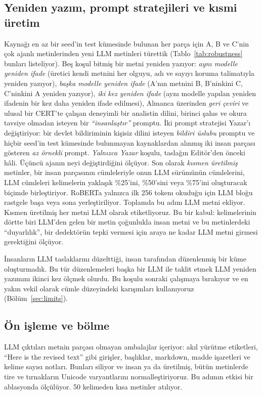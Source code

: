 \documentclass[journal]{IEEEtran}
\begin{document}
\subsection{Yeniden yazım, prompt stratejileri ve kısmi üretim}
Kaynağı en az bir seed'in test kümesinde bulunan her parça için A, B ve C'nin çok ajanlı metinlerinden yeni LLM
metinleri türettik (Tablo~\ref{tab:robustness} bunları listeliyor). Beş koşul bitmiş bir metni yeniden yazıyor:
\emph{aynı modelle yeniden ifade} (üretici kendi metnini her olguyu, adı ve sayıyı koruma talimatıyla yeniden
yazıyor), \emph{başka modelle yeniden ifade} (A'nın metnini B, B'ninkini C, C'ninkini A yeniden yazıyor), \emph{iki
kez yeniden ifade} (aynı modelle yapılan yeniden ifadenin bir kez daha yeniden ifade edilmesi), Almanca üzerinden
\emph{geri çeviri} ve ulusal bir CERT'te çalışan deneyimli bir analistin dilini, birinci şahıs ve okura tavsiye
olmadan isteyen bir \emph{``insanlaştır''} promptu. İki prompt stratejisi Yazar'ı değiştiriyor: bir devlet
bildiriminin kişisiz dilini isteyen \emph{bildiri üslubu} promptu ve hiçbir seed'in test kümesinde bulunmayan
kaynaklardan alınmış iki insan parçası gösteren \emph{az örnekli} prompt. \emph{Yalnızca Yazar} koşulu, taslağın
Editör'den önceki hâli. Üçüncü ajanın neyi değiştirdiğini ölçüyor. Son olarak \emph{kısmen üretilmiş} metinler, bir
insan parçasının cümleleriyle onun LLM sürümünün cümlelerini, LLM cümleleri kelimelerin yaklaşık \%25'ini,
\%50'sini veya \%75'ini oluşturacak biçimde birleştiriyor. RoBERTa yalnızca ilk 256 tokenı okuduğu için LLM bloğu
rastgele başa veya sona yerleştiriliyor. Toplamda bu adım \NVarTexts{} LLM metni ekliyor. Kısmen üretilmiş her metni
LLM olarak etiketliyoruz. Bu bir kabul: kelimelerinin dörtte biri LLM'den gelen bir metin çoğunlukla insan metni ve
bu metinlerdeki ``duyarlılık'', bir dedektörün tepki vermesi için araya ne kadar LLM metni girmesi gerektiğini
ölçüyor.

İnsanların LLM taslaklarını düzelttiği, insan tarafından düzenlenmiş bir küme oluşturmadık. Bu tür düzenlemeleri
başka bir LLM ile taklit etmek LLM yeniden yazımını ikinci kez ölçmek olurdu. Bu koşulu sonraki çalışmaya bırakıyor
ve en yakın vekil olarak cümle düzeyindeki karışımları kullanıyoruz (Bölüm~\ref{sec:limits}).

\subsection{Ön işleme ve bölme}
LLM çıktıları metnin parçası olmayan ambalajlar içeriyor: akıl yürütme etiketleri, ``Here is the revised text'' gibi
girişler, başlıklar, markdown, madde işaretleri ve kelime sayısı notları. Bunları siliyor ve insan ya da üretilmiş,
bütün metinlerde tire ve tırnakların Unicode varyantlarını normalleştiriyoruz. Bu adımın etkisi bir ablasyonda
ölçülüyor. 50 kelimeden kısa metinler atılıyor.
\end{document}
